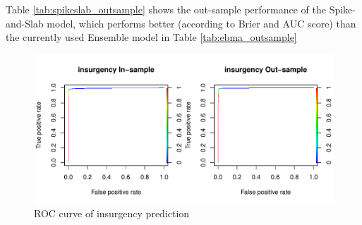 \documentclass{article}
\begin{document}
\begin{table}[H]
\centering
{}
\caption{Table \autoref{tab:spikeslab_outsample} shows the out-sample performance of the Spike-and-Slab model, which performs better (according to Brier and AUC score) than the currently used Ensemble model in Table \autoref{tab:ebma_outsample}}
\end{table}

\begin{figure}[H]
\includegraphics[width=\textwidth]{fig/spikeslab_roc_insurgency}
\caption{ROC curve of insurgency prediction}
\label{fig:spikeslab_roc_insurgency}
\end{figure}
\end{document}
